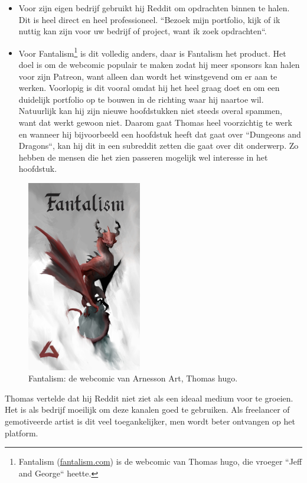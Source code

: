\begin{itemize} 
	\item Voor zijn eigen bedrijf gebruikt hij Reddit om opdrachten binnen te halen. Dit is heel direct en heel professioneel. ``Bezoek mijn portfolio, kijk of ik nuttig kan zijn voor uw bedrijf of project, want ik zoek opdrachten``.
	\item Voor Fantalism\footnote{Fantalism (\href{https://fantalism.com/}{fantalism.com}) is de webcomic van Thomas hugo, die vroeger ``Jeff and George`` heette.} is dit volledig anders, daar is Fantalism het product. Het doel is om de webcomic populair te maken zodat hij meer sponsors kan halen voor zijn Patreon, want alleen dan wordt het winstgevend om er aan te werken. Voorlopig is dit vooral omdat hij het heel graag doet en om een duidelijk portfolio op te bouwen in de richting waar hij naartoe wil. Natuurlijk kan hij zijn nieuwe hoofdstukken niet steeds overal spammen, want dat werkt gewoon niet. Daarom gaat Thomas heel voorzichtig te werk en wanneer hij bijvoorbeeld een hoofdstuk heeft dat gaat over ``Dungeons and Dragons``, kan hij dit in een subreddit zetten die gaat over dit onderwerp. Zo hebben de mensen die het zien passeren mogelijk wel interesse in het hoofdstuk.
\end{itemize} 
\begin{figure}[h!]
	\includegraphics[width=50mm,scale=0.5]{img/arnesson-art-fantalism.jpg}
	\centering
	\caption{Fantalism: de webcomic van Arnesson Art, Thomas hugo.}
	\label{fig:fantalism}
\end{figure}
Thomas vertelde dat hij Reddit niet ziet als een ideaal medium voor te groeien. Het is als bedrijf moeilijk om deze kanalen goed te gebruiken. Als freelancer of gemotiveerde artist is dit veel toegankelijker, men wordt beter ontvangen op het platform.
	
